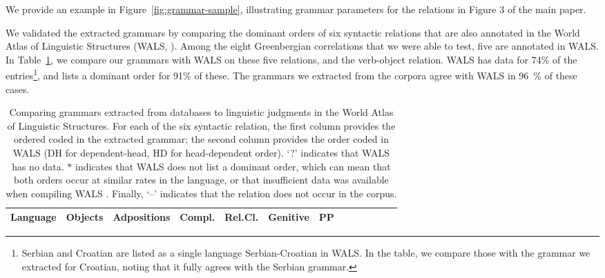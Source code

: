 \documentclass[10pt,twoside,lineno]{article}
\begin{document}
We provide an example in Figure~\ref{fig:grammar-sample}, illustrating grammar parameters for the relations in Figure 3 of the main paper.



We validated the extracted grammars by comparing the dominant orders of six syntactic relations that are also annotated in the World Atlas of Linguistic Structures (WALS, \cite{haspelmath2005world}).
Among the eight Greenbergian correlations that we were able to test, five are annotated in WALS.
In Table~\ref{tab:grammars-wals}, we compare our grammars with WALS on these five relations, and the verb-object relation.
WALS has data for 74\% of the entries\footnote{Serbian and Croatian are listed as a single language Serbian-Croatian in WALS. In the table, we compare those with the grammar we extracted for Croatian, noting that it fully agrees with the Serbian grammar.}, and lists a dominant order for 91\% of these.
The grammars we extracted from the corpora agree with WALS in 96~\%  of these cases.


\begin{table}
\small{
\begin{center}
\begin{tabular}{l||ll|ll|ll|ll|ll|ll|llllll}
		   Language 
		   &	\multicolumn{2}{|c|}{Objects} 
		   &	\multicolumn{2}{|c|}{Adpositions} 
		   &	\multicolumn{2}{|c|}{Compl.} 
		   &	\multicolumn{2}{|c|}{Rel.Cl.} 
		   &	\multicolumn{2}{|c|}{Genitive} 
		   &	\multicolumn{2}{|c|}{PP}  \\ \hline\hline
	
\end{tabular}
\end{center}
}
\caption{Comparing grammars extracted from databases to linguistic judgments in the World Atlas of Linguistic Structures. For each of the six syntactic relation, the first column provides the ordered coded in the extracted grammar; the second column provides the order coded in WALS (DH for dependent-head, HD for head-dependent order). `?' indicates that WALS has no data.
$*$ indicates that WALS does not list a dominant order, which can mean that both orders occur at similar rates in the language, or that insufficient data was available when compiling WALS \citep{dryer2011evidence}.
Finally, `--' indicates that the relation does not occur in the corpus.
}\label{tab:grammars-wals}
\end{table}
\end{document}
